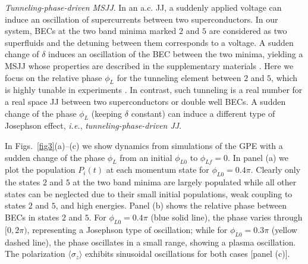\documentclass[twocolumn,prl,floatfix,citeautoscript,nofootinbib,superscriptaddress]{revtex4}
\begin{document}
{\color{blue}\emph{Tunneling-phase-driven MSJJ}}. In an a.c. JJ, a suddenly
applied voltage can induce an oscillation of supercurrents between two
superconductors. In our system, BECs at the two band minima marked $2$ and $%
5 $ are considered as two superfluids and the detuning between them
corresponds to a voltage. A sudden change of $\delta $ induces an
oscillation of the BEC between the two minima, yielding a MSJJ whose
properties are described in the supplementary materials \cite{Supp}. Here we
focus on the relative phase $\phi _{L}$ for the tunneling element between $2$
and $5$, which is highly tunable in experiments \cite{Spielman2015}. In
contrast, such tunneling is a real number for a real space JJ between two
superconductors or double well BECs. A sudden change of the phase $\phi _{L}$
(keeping $\delta $ constant) can induce a different type of Josephson
effect, \textit{i.e.}, \textit{tunneling-phase-driven JJ}.

In Figs.~\ref{fig3}(a)--(c) we show dynamics from simulations of the GPE
with a sudden change of the phase $\phi _{L}$ from an initial $\phi _{L0}$
to $\phi _{Lf}=0$. In panel (a) we plot the population $P_{i}\left( t\right)
$ at each momentum state for $\phi _{L0}=0.4\pi $. Clearly only the states $%
2 $ and $5$ at the two band minima are largely populated while all other
states can be neglected due to their small initial populations, weak
coupling to states $2$ and $5$, and high energies. Panel (b) shows the
relative phase between BECs in states $2$ and $5$. For $\phi _{L0}=0.4\pi $
(blue solid line), the phase varies through $[0,2\pi )$, representing a
Josephson type of oscillation; while for $\phi _{L0}=0.3\pi $ (yellow dashed
line), the phase oscillates in a small range, showing a plasma oscillation.
The polarization $\langle \sigma _{z}\rangle $ exhibits sinusoidal
oscillations for both cases [panel (c)].
\end{document}
